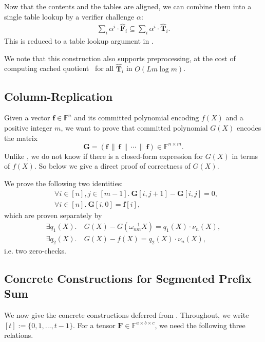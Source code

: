 Now that the contents and the tables are aligned,
  we can combine them into a single table lookup by a verifier challenge $\alpha$:
  \begin{align}
    \sum_i \alpha^i\cdot \widehat{\mathbf{F}}_i \subseteq \sum_i \alpha^i\cdot \widehat{\mathbf{T}}_i.
  \end{align}
  This is reduced to a table lookup argument in \cite{cq++24}.

We note that this construction also supports preprocessing,
  at the cost of computing cached quotient~\cite{cq22}
  for all $\widehat{\mathbf{T}}_i$ in $O(Lm\log m)$.

\subsection{Column-Replication}\label{app:replication}
Given a vector $\mathbf{f}\in\mathbb{F}^n$ and
  its committed polynomial encoding $f(X)$ and a positive integer $m$,
  we want to prove
  that committed polynomial $G(X)$ encodes the matrix
  \[
    \mathbf{G} = (\mathbf{f}\,\|\,\mathbf{f}\,\|\,\cdots\,\|\,\mathbf{f}) \in \mathbb{F}^{n\times m}.
  \]
  Unlike , we do not know if there
  is a closed-form expression for $G(X)$ in terms of $f(X)$.
  So below we give a direct proof of correctness of $G(X)$.

We prove the following two identities:
\begin{align}
    &\forall i\in[n], j\in[m-1].\ \mathbf{G}[i, j+1] - \mathbf{G}[i, j] = 0,\\
    &\forall i\in [n].\ \mathbf{G}[i, 0] = \mathbf{f}[i],
\end{align}
which are proven separately by
\begin{align}
  \exists q_1(X).&\
  G(X) - G(\omega_{nm}^{-1}X) = q_1(X)\cdot \nu_n(X),\\
  \exists q_2(X).&\
  G(X) - f(X) = q_2(X)\cdot \nu_n(X),
\end{align}
i.e. two zero-checks.

\subsection{Concrete Constructions for Segmented Prefix Sum}\label{app:prefix-sum}

We now give the concrete constructions deferred from
. Throughout, we write
$[t]:=\{0,1,\dots,t-1\}$.
For a tensor $\mathbf{F}\in\mathbb{F}^{a\times b\times c}$,
we need the following three relations.

